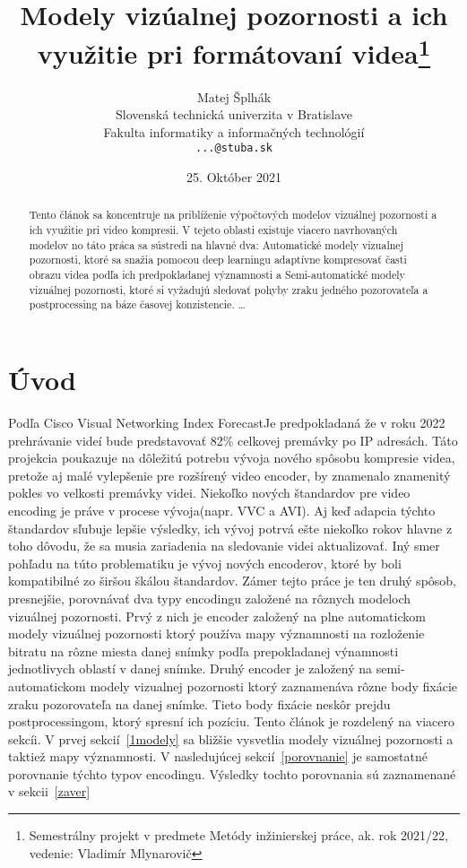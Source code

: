 \documentclass[10pt,twoside,slovak,a4paper]{article}
\title{Modely vizúalnej pozornosti a ich využitie pri formátovaní videa\thanks{Semestrálny projekt v predmete Metódy inžinierskej práce, ak. rok 2021/22, vedenie: Vladimír Mlynarovič}} %
\author{Matej Šplhák\\[2pt]
	{\small Slovenská technická univerzita v Bratislave}\\
	{\small Fakulta informatiky a informačných technológií}\\
	{\small \texttt{...@stuba.sk}}
	}
\date{\small 25. Október 2021} %
\begin{document}
\maketitle
\begin{abstract}
Tento článok sa koncentruje na priblíženie výpočtových modelov vizuálnej pozornosti a ich využitie pri video kompresii. V tejeto oblasti existuje viacero navrhovaných modelov no táto práca sa sústredi na hlavné dva: Automatické modely vizualnej pozornosti, ktoré sa snažia pomocou deep learningu adaptívne kompresovať časti obrazu videa podľa ich predpokladanej významnosti a Semi-automatické modely vizuálnej pozornosti, ktoré  si vyžadujú sledovať pohyby zraku jedného pozorovateľa a postprocessing na báze časovej konzistencie. 
\ldots
\end{abstract}


\section{Úvod}
Podľa Cisco  Visual  Networking  Index  Forecast\cite{cisco:forecast}Je predpokladaná že v roku 2022 prehrávanie videí bude predstavovať 82\% celkovej premávky po IP adresách. Táto projekcia poukazuje na dôležitú potrebu vývoja nového spôsobu kompresie videa, pretože aj malé vylepšenie pre rozšírený video encoder, by znamenalo znamenitý pokles vo velkosti premávky videi. Niekoľko nových štandardov pre video encoding je práve v procese vývoja(napr. VVC a AVI). Aj keď adapcia týchto štandardov sľubuje lepšie výsledky, ich vývoj potrvá ešte niekoľko rokov hlavne z toho dôvodu, že sa musia zariadenia na sledovanie videi aktualizovať. Iný smer pohľadu na túto problematiku je vývoj nových encoderov, ktoré by boli kompatibilné zo širšou škálou štandardov. Zámer tejto práce je ten druhý spôsob, presnejšie, porovnávať dva typy encodingu založené na rôznych modeloch vizuálnej pozornosti. Prvý z nich\cite{Czarnecki:Progress} je encoder založený na plne automatickom modely vizuálnej pozornosti ktorý používa mapy významnosti na rozloženie bitratu na rôzne miesta danej snímky podľa prepokladanej výnamnosti jednotlivych oblastí v danej snímke. Druhý encoder\cite{Coplien:MPD} je založený na semi-automatickom modely vizualnej pozornosti ktorý zaznamenáva rôzne body fixácie zraku pozorovateľa na danej snímke. Tieto body fixácie neskôr prejdu postprocessingom, ktorý spresní ich pozíciu. Tento článok je rozdelený na viacero sekcíi. V prvej sekcií~\ref{1modely} sa bližšie vysvetlia modely vizuálnej pozornosti a taktiež mapy významnosti. V nasledujúcej sekcií~\ref{porovnanie} je samostatné porovnanie týchto typov encodingu. Výsledky tochto porovnania sú zaznamenané v sekcii~\ref{zaver}   
\end{document}
